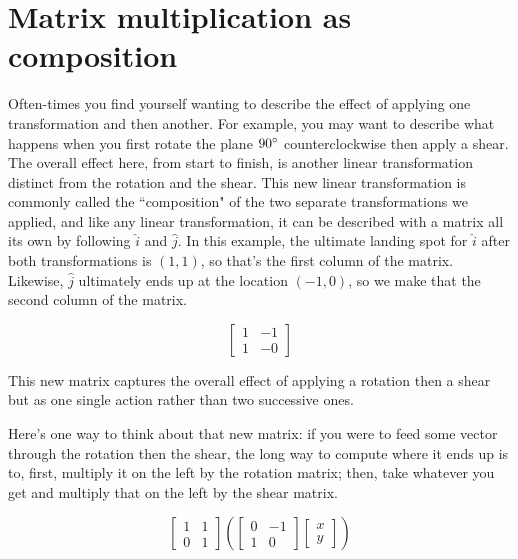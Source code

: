 \section{Matrix multiplication as composition}

Often-times you find yourself wanting to describe the effect of applying one
transformation and then another. For example, you may want to describe what
happens when you first rotate the plane $90\degree$ counterclockwise then apply
a shear. The overall effect here, from start to finish, is another linear
transformation distinct from the rotation and the shear. This new linear
transformation is commonly called the ``composition" of the two separate
transformations we applied, and like any linear transformation, it can be
described with a matrix all its own by following $\hat{i}$ and $\hat{j}$. In
this example, the ultimate landing spot for $\hat{i}$ after both transformations
is $(1, 1)$, so that's the first column of the matrix. Likewise, $\hat{j}$
ultimately ends up at the location $(-1, 0)$, so we make that the second column
of the matrix.

\begin{equation*}
  \begin{bmatrix}
    1 & -1 \\
    1 & -0
  \end{bmatrix}
\end{equation*}

This new matrix captures the overall effect of applying a rotation then a shear
but as one single action rather than two successive ones.

Here's one way to think about that new matrix: if you were to feed some vector
through the rotation then the shear, the long way to compute where it ends up is
to, first, multiply it on the left by the rotation matrix; then, take whatever
you get and multiply that on the left by the shear matrix.

\begin{equation*}
  \begin{bmatrix}
    1 & 1 \\
    0 & 1
  \end{bmatrix}\left(
  \begin{bmatrix}
    0 & -1 \\
    1 & 0
  \end{bmatrix}
  \begin{bmatrix}
    x \\
    y
  \end{bmatrix}\right)
\end{equation*}


